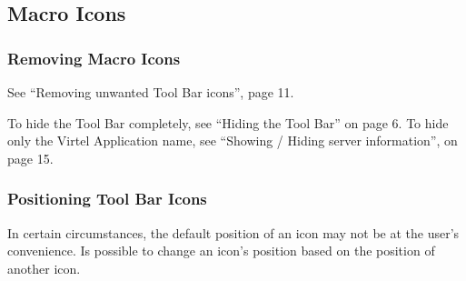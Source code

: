 \documentclass[letterpaper,10pt,english]{sphinxmanual}
\begin{document}
\subsection{Macro Icons}
\label{\detokenize{Customization:macro-icons}}\label{\detokenize{Customization:index-31}}
\ignorespaces 

\subsubsection{Removing Macro Icons}
\label{\detokenize{Customization:removing-macro-icons}}\label{\detokenize{Customization:index-32}}
See “Removing unwanted Tool Bar icons”, page 11.

To hide the Tool Bar completely, see “Hiding the Tool Bar” on page 6. To hide only the Virtel Application name, see “Showing / Hiding server information”, on page 15.


\subsubsection{Positioning Tool Bar Icons}
\label{\detokenize{Customization:positioning-tool-bar-icons}}
In certain circumstances, the default position of an icon may not be at the user’s convenience. Is possible to change an icon’s position based on the position of another icon.
\end{document}
